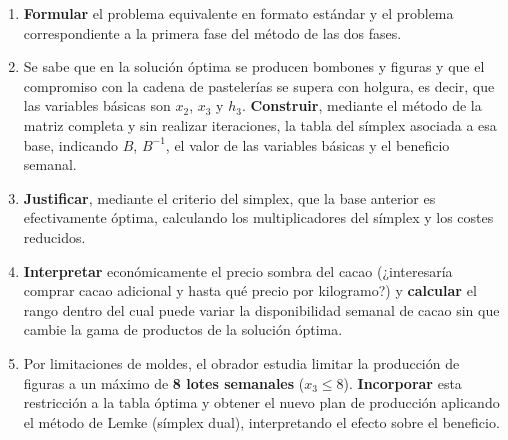 \begin{enumerate}
    \item \textbf{Formular} el problema equivalente en formato estándar y el problema correspondiente a la primera fase del método de las dos fases.
    \item Se sabe que en la solución óptima se producen bombones y figuras y que el compromiso con la cadena de pastelerías se supera con holgura, es decir, que las variables básicas son $x_2$, $x_3$ y $h_3$. \textbf{Construir}, mediante el método de la matriz completa y sin realizar iteraciones, la tabla del símplex asociada a esa base, indicando $B$, $B^{-1}$, el valor de las variables básicas y el beneficio semanal.
    \item \textbf{Justificar}, mediante el criterio del simplex, que la base anterior es efectivamente óptima, calculando los multiplicadores del símplex y los costes reducidos.
    \item \textbf{Interpretar} económicamente el precio sombra del cacao (¿interesaría comprar cacao adicional y hasta qué precio por kilogramo?) y \textbf{calcular} el rango dentro del cual puede variar la disponibilidad semanal de cacao sin que cambie la gama de productos de la solución óptima.
    \item Por limitaciones de moldes, el obrador estudia limitar la producción de figuras a un máximo de \textbf{8 lotes semanales} ($x_3 \leq 8$). \textbf{Incorporar} esta restricción a la tabla óptima y obtener el nuevo plan de producción aplicando el método de Lemke (símplex dual), interpretando el efecto sobre el beneficio.
\end{enumerate}

